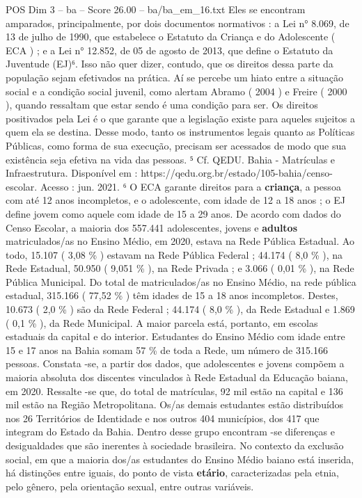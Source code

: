 \begin{textsample}{POS Dim 3 – ba – Score 26.00 – ba/ba\_em\_16.txt}
Eles se encontram amparados, principalmente, por dois documentos normativos : a Lei n{\EmojiFont °} 8.069, de 13 de julho de 1990, que estabelece o Estatuto da Criança e do Adolescente ( ECA ) ; e a Lei n{\EmojiFont °} 12.852, de 05 de agosto de 2013, que define o Estatuto da Juventude (EJ)⁶.
Isso não quer dizer, contudo, que os direitos dessa parte da população sejam efetivados na prática.
Aí se percebe um hiato entre a situação social e a condição social juvenil, como alertam Abramo ( 2004 ) e Freire ( 2000 ), quando ressaltam que estar sendo é uma condição para ser.
Os direitos positivados pela Lei é o que garante que a legislação existe para aqueles sujeitos a quem ela se destina.
Desse modo, tanto os instrumentos legais quanto as Políticas Públicas, como forma de sua execução, precisam ser acessados de modo que sua existência seja efetiva na vida das pessoas. ⁵ Cf.
QEDU.
Bahia - Matrículas e Infraestrutura.
Disponível em : https://qedu.org.br/estado/105-bahia/censo-escolar.
Acesso : jun. 2021. ⁶ O ECA garante direitos para a \textbf{criança}, a pessoa com até 12 anos incompletos, e o adolescente, com idade de 12 a 18 anos ; o EJ define jovem como aquele com idade de 15 a 29 anos.
De acordo com dados do Censo Escolar, a maioria dos 557.441 adolescentes, jovens e \textbf{adultos} matriculados/as no Ensino Médio, em 2020, estava na Rede Pública Estadual.
Ao todo, 15.107 ( 3,08 \% ) estavam na Rede Pública Federal ; 44.174 ( 8,0 \% ), na Rede Estadual, 50.950 ( 9,051 \% ), na Rede Privada ; e 3.066 ( 0,01 \% ), na Rede Pública Municipal.
Do total de matriculados/as no Ensino Médio, na rede pública estadual, 315.166 ( 77,52 \% ) têm idades de 15 a 18 anos incompletos.
Destes, 10.673 ( 2,0 \% ) são da Rede Federal ; 44.174 ( 8,0 \% ), da Rede Estadual e 1.869 ( 0,1 \% ), da Rede Municipal.
A maior parcela está, portanto, em escolas estaduais da capital e do interior.
Estudantes do Ensino Médio com idade entre 15 e 17 anos na Bahia somam 57 \% de toda a Rede, um número de 315.166 pessoas.
Constata -se, a partir dos dados, que adolescentes e jovens compõem a maioria absoluta dos discentes vinculados à Rede Estadual da Educação baiana, em 2020.
Ressalte -se que, do total de matrículas, 92 mil estão na capital e 136 mil estão na Região Metropolitana.
Os/as demais estudantes estão distribuídos nos 26 Territórios de Identidade e nos outros 404 municípios, dos 417 que integram do Estado da Bahia.
Dentro desse grupo encontram -se diferenças e desigualdades que são inerentes à sociedade brasileira.
No contexto da exclusão social, em que a maioria dos/as estudantes do Ensino Médio baiano está inserida, há distinções entre iguais, do ponto de vista \textbf{etário}, caracterizadas pela etnia, pelo gênero, pela orientação sexual, entre outras variáveis.

\end{textsample}
